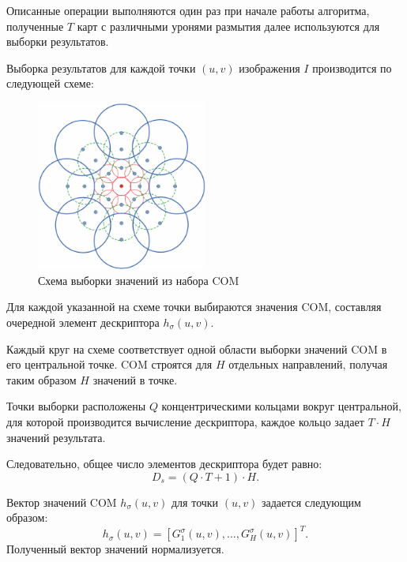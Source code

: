 {{{{{		Описанные операции выполняются один раз при начале работы алгоритма, полученные $T$ карт с различными уронями размытия далее используются для выборки результатов. 
		
		Выборка результатов для каждой точки $(u,v)$ изображения $I$ производится по следующей схеме:
		
		\begin{figure}[H]
			\centering                             
			\includegraphics[width=0.5\textwidth,keepaspectratio]{daisy/DAISY-descriptor-structure.png}   
			\centering\caption{ Схема выборки значений из набора COM }
			\label{daisy_pattern}                           
		\end{figure}    
		
		Для каждой указанной на схеме точки выбираются значения COM, составляя очередной элемент дескриптора $h_\sigma(u,v)$. 
		
	    Каждый круг на схеме соответствует одной области выборки значений COM в его центральной точке. COM строятся для $H$ отдельных направлений, получая таким образом $H$ значений в точке.
		
		Точки выборки расположены $Q$ концентрическими кольцами вокруг центральной, для которой производится вычисление дескриптора, каждое кольцо задает $T \cdot H$ значений результата.
		
		Следовательно, общее число элементов дескриптора будет равно:
		\begin{equation}\label{elements_count}
		 D_s=(Q \cdot T+1)\cdot H.
		\end{equation}
		
		Вектор значений COM $h_\sigma(u,v)$ для точки $(u,v)$ задается следующим образом:
		\begin{equation}\label{single_vector}
		h_\sigma(u,v) = \left[G_1^\sigma(u,v), \dots, G_H^\sigma(u,v)\right]^T.
		\end{equation}
		Полученный вектор значений нормализуется. 
		
}}}}}
